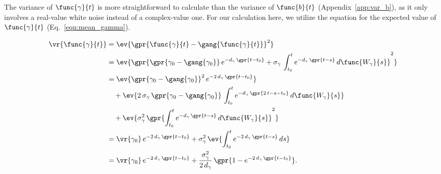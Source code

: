 The variance of $\func{\gamma}{t}$ is more straightforward to calculate than the variance of $\func{b}{t}$ (Appendix~\ref{app:var_b}), as it only involves a real-value white noise instead of a complex-value one. For our calculation here, we utilize the equation for the expected value of $\func{\gamma}{t}$ (Eq.~\ref{eqn:mean_gamma}).

\begin{align}
    \vr{\func{\gamma}{t}} &= \ev{\gpr{\func{\gamma}{t} - \gang{\func{\gamma}{t}}}^2} \nonumber \\
    	&= \ev{\gpr{\gpr{\gamma_0 - \gang{\gamma_0}}\,e^{-d_{\gamma}\,\gpr{t - t_0}} + \sigma_{\gamma}\,\int_{t_0}^{t} e^{-d_{\gamma}\,\gpr{t - s}}\,d\func{W_{\gamma}}{s}}^2} \nonumber \\
    	&= \ev{\gpr{\gamma_0 - \gang{\gamma_0}}^2\,e^{-2\,d_{\gamma}\,\gpr{t - t_0}}} \nonumber \\
    		&\quad + \ev{2\,\sigma_{\gamma}\,\gpr{\gamma_0 - \gang{\gamma_0}}\,\int_{t_0}^{t} e^{-d_{\gamma}\,\gpr{2\,t - s - t_0}}\,d\func{W_{\gamma}}{s}} \nonumber \\
    		&\quad + \ev{\sigma_{\gamma}^2\,\gpr{\int_{t_0}^{t} e^{-d_{\gamma}\,\gpr{t - s}}\,d\func{W_{\gamma}}{s}}^2} \nonumber \\
    	&= \vr{\gamma_0}\,e^{-2\,d_{\gamma}\,\gpr{t - t_0}} + \sigma_{\gamma}^2\,\ev{\int_{t_0}^{t} e^{-2\,d_{\gamma}\,\gpr{t - s}}\,ds} \nonumber \\
    &= \vr{\gamma_0}\,e^{-2\,d_{\gamma}\,\gpr{t - t_0}} + \frac{\sigma_{\gamma}^2}{2\,d_{\gamma}}\,\gpr{1 - e^{-2\,d_{\gamma}\,\gpr{t - t_0}}}. \label{eqn:var_gamma}
\end{align}